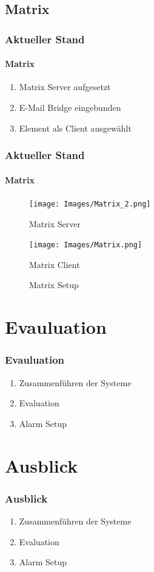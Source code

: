 \documentclass[]{beamer}
\begin{document}
\subsection{Matrix}
\begin{frame}
	\frametitle{Aktueller Stand}
	\framesubtitle{Matrix}
	\begin{enumerate}
		\item Matrix Server aufgesetzt
		\item E-Mail Bridge eingebunden
		\item Element als Client ausgewählt
	\end{enumerate}
\end{frame}

\begin{frame}
	\frametitle{Aktueller Stand}
	\framesubtitle{Matrix}
	\begin{figure}
		\centering
		\begin{minipage}[t]{0.45\textwidth}
			\centering
			\texttt{[image: Images/Matrix\_2.png]}
			\caption*{Matrix Server}
		\end{minipage}
		\hfill
		\begin{minipage}[t]{0.45\textwidth}
			\centering
			\texttt{[image: Images/Matrix.png]}
			\caption*{Matrix Client}
		\end{minipage}
		\hfill
		\caption{Matrix Setup}
		\label{fig:Matrix}
	\end{figure}
\end{frame}


\section{Evauluation}
\begin{frame}
	\frametitle{Evauluation}
	\begin{enumerate}
		\item Zusammenführen der Systeme
		\item Evaluation
		\item Alarm Setup
	\end{enumerate}
\end{frame}

\section{Ausblick}
\begin{frame}
	\frametitle{Ausblick}
	\begin{enumerate}
		\item Zusammenführen der Systeme
		\item Evaluation
		\item Alarm Setup
	\end{enumerate}
\end{frame}
\end{document}
